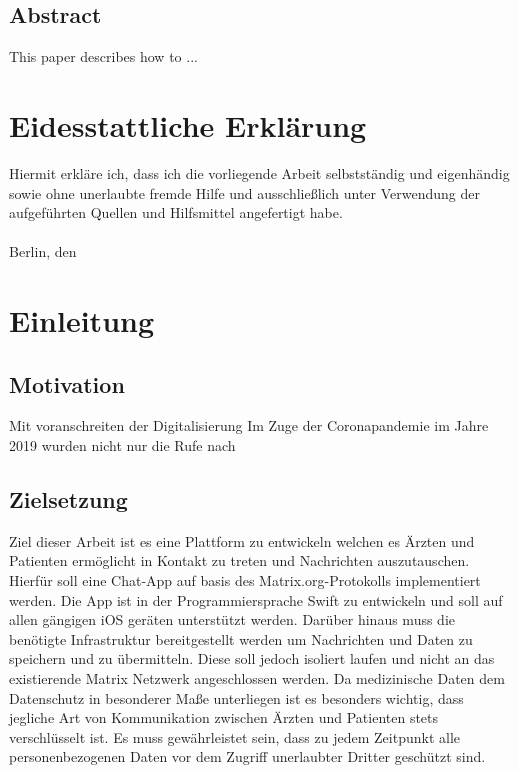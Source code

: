    \section*{Abstract}\label{sec:abstract}
    This paper describes how to ...
    \newpage
    \chapter*{Eidesstattliche Erklärung}\label{ch:eidesstattliche-erklarung}
    Hiermit erkläre ich, dass ich die vorliegende Arbeit selbstständig und eigenhändig sowie ohne
    unerlaubte fremde Hilfe und ausschließlich unter Verwendung der aufgeführten Quellen und
    Hilfsmittel angefertigt habe.\\
    \vspace{1cm}\\
    Berlin, den \underline{\hspace{3cm}} \hfill \DeinName \underline{\hspace{4cm}}

    \newpage
    \tableofcontents

    \mainmatter

    \newpage
    \chapter{Einleitung}\label{ch:einleitung}

    \section{Motivation}\label{sec:motivation}
    Mit voranschreiten der Digitalisierung
    Im Zuge der Coronapandemie im Jahre 2019 wurden nicht nur die Rufe nach

    \section{Zielsetzung}\label{sec:zielsetzung}
    Ziel dieser Arbeit ist es eine Plattform zu entwickeln welchen es Ärzten und Patienten ermöglicht in Kontakt zu treten und Nachrichten auszutauschen.
    Hierfür soll eine Chat-App auf basis des Matrix.org-Protokolls implementiert werden.
    Die App ist in der Programmiersprache Swift zu entwickeln und soll auf allen gängigen iOS geräten unterstützt werden.
    Darüber hinaus muss die benötigte Infrastruktur bereitgestellt werden um Nachrichten und Daten zu speichern und zu übermitteln.
    Diese soll jedoch isoliert laufen und nicht an das existierende Matrix Netzwerk angeschlossen werden.
    Da medizinische Daten dem Datenschutz in besonderer Maße unterliegen ist es besonders wichtig,
    dass jegliche Art von Kommunikation zwischen Ärzten und Patienten stets verschlüsselt ist.
    Es muss gewährleistet sein, dass zu jedem Zeitpunkt alle personenbezogenen Daten vor dem Zugriff unerlaubter Dritter geschützt sind.

